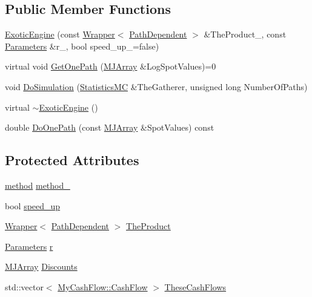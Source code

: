 \subsection*{Public Member Functions}
\begin{DoxyCompactItemize}
\item 
\hyperlink{classExoticEngine_a8f2b07aae083e53933b539a9e36df536}{Exotic\+Engine} (const \hyperlink{classWrapper}{Wrapper}$<$ \hyperlink{classPathDependent}{Path\+Dependent} $>$ \&The\+Product\+\_\+, const \hyperlink{classParameters}{Parameters} \&r\+\_\+, bool speed\+\_\+up\+\_\+=false)
\item 
virtual void \hyperlink{classExoticEngine_a1be567d24e89abadb95bb2af7224b54e}{Get\+One\+Path} (\hyperlink{classMJArray}{M\+J\+Array} \&Log\+Spot\+Values)=0
\item 
void \hyperlink{classExoticEngine_a50efae4a77089d6a596153c9c94f1412}{Do\+Simulation} (\hyperlink{classStatisticsMC}{Statistics\+MC} \&The\+Gatherer, unsigned long Number\+Of\+Paths)
\item 
virtual \hyperlink{classExoticEngine_a9ca6c7fadc943a9f00460ae6371bd6a2}{$\sim$\+Exotic\+Engine} ()
\item 
double \hyperlink{classExoticEngine_ac52ddfbb69f3bd1aa2f87114406e1725}{Do\+One\+Path} (const \hyperlink{classMJArray}{M\+J\+Array} \&Spot\+Values) const
\end{DoxyCompactItemize}
\subsection*{Protected Attributes}
\begin{DoxyCompactItemize}
\item 
\hyperlink{PathDependent_8h_abed946c62f140eb7ff2ac742e6ad9497}{method} \hyperlink{classExoticEngine_aa0046882f659ebb2e5efa29e28a28c20}{method\+\_\+}
\item 
bool \hyperlink{classExoticEngine_a2a770397b5cb3f352bcd4a7834883607}{speed\+\_\+up}
\item 
\hyperlink{classWrapper}{Wrapper}$<$ \hyperlink{classPathDependent}{Path\+Dependent} $>$ \hyperlink{classExoticEngine_a16475790e675a12ac23a01d81c5557de}{The\+Product}
\item 
\hyperlink{classParameters}{Parameters} \hyperlink{classExoticEngine_a8efb47da1329445047b7d041bf9c4d7b}{r}
\item 
\hyperlink{classMJArray}{M\+J\+Array} \hyperlink{classExoticEngine_acb40f9478cb8d11947bf2052e5ebea0c}{Discounts}
\item 
std\+::vector$<$ \hyperlink{classMyCashFlow_1_1CashFlow}{My\+Cash\+Flow\+::\+Cash\+Flow} $>$ \hyperlink{classExoticEngine_af4c36f88d17b753e174b6db02bade7e6}{These\+Cash\+Flows}
\end{DoxyCompactItemize}


